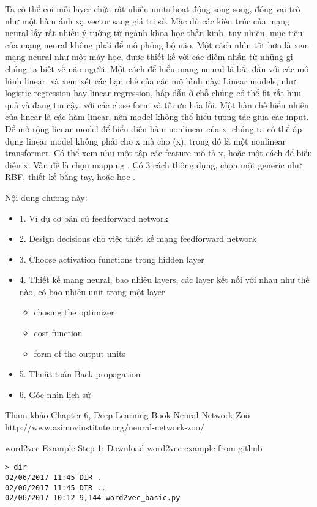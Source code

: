 Ta có thể coi mỗi layer chứa rất nhiều units hoạt động song song, đóng vai trò như một hàm ánh xạ vector sang giá trị số. Mặc dù các kiến trúc của mạng neural lấy rất nhiều ý tưởng từ ngành khoa học thần kinh, tuy nhiên, mục tiêu của mạng neural không phải để mô phỏng bộ não. Một cách nhìn tốt hơn là xem mạng neural như một máy học, được thiết kế với các điểm nhấn từ những gi chúng ta biết về não người.
Một cách để hiểu mạng neural là bắt đầu với các mô hình linear, và xem xét các hạn chế của các mô hình này. Linear models, như logistic regression hay linear regression, hấp dẫn ở chỗ chúng có thể fit rất hữu quả và đang tin cậy, với các close form và tối ưu hóa lồi. Một hàn chế hiển nhiên của linear là các hàm linear, nên model không thể hiểu tương tác giữa các input.
Để mở rộng lienar model để biểu diễn hàm nonlinear của x, chúng ta có thể áp dụng linear model không phải cho x mà cho (x), trong đó là một nonlinear transformer. Có thể xem như một tập các feature mô tả x, hoặc một cách để biểu diễn x. Vấn đề là chọn mapping . Có 3 cách thông dụng, chọn một generic như RBF, thiết kế bằng tay, hoặc học .

Nội dung chương này:

\begin{itemize}
  \item 1. Ví dụ cơ bản củ feedforward network
  \item 2. Design decisions cho việc thiết kế mạng feedforward network
  \item 3. Choose activation functions trong hidden layer
  \item 4. Thiết kế mạng neural, bao nhiêu layers, các layer kết nối với nhau như thế nào, có bao nhiêu unit trong một layer
  \begin{itemize}
    \item chosing the optimizer
    \item cost function
    \item form of the output units
  \end{itemize}
  \item 5. Thuật toán Back-propagation
  \item 6. Góc nhìn lịch sử
\end{itemize}


Tham khảo
Chapter 6, Deep Learning Book
Neural Network Zoo http://www.asimovinstitute.org/neural-network-zoo/


word2vec Example
Step 1: Download word2vec example from github

\begin{lstlisting}
> dir
02/06/2017 11:45 DIR .
02/06/2017 11:45 DIR ..
02/06/2017 10:12 9,144 word2vec_basic.py
\end{lstlisting}



